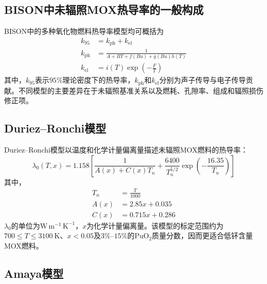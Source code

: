 \subsection{BISON中未辐照MOX热导率的一般构成}

BISON中的多种氧化物燃料热导率模型均可概括为
\begin{equation}
	\begin{aligned}
		k_{95}&=k_{\mathrm{ph}}+k_{\mathrm{el}}
				\\
				k_{\mathrm{ph}}
				&=\frac{1}{A+BT+f(Bu)+g(Bu)h(T)}
				\\
				k_{\mathrm{el}}
				&=i(T)\exp\!\left(-\frac{F}{T}\right)
	\end{aligned}
	\label{eq:appendix_bison_thermal_conductivity_general}
\end{equation}
\label{eq:appendix_bison_k95}
\label{eq:appendix_bison_phonon}
\label{eq:appendix_bison_electronic}
其中，$k_{95}$表示$95\%$理论密度下的热导率，$k_{\mathrm{ph}}$和$k_{\mathrm{el}}$分别为声子传导与电子传导贡献。不同模型的主要差异在于未辐照基准关系以及燃耗、孔隙率、组成和辐照损伤修正项。

\subsection{Duriez--Ronchi模型}

Duriez--Ronchi模型以温度和化学计量偏离量描述未辐照MOX燃料的热导率：
\begin{equation}
	\lambda_0(T,x)=1.158
	\left[
	\frac{1}{A(x)+C(x)T_n}
	+\frac{6400}{T_n^{5/2}}
	\exp\!\left(-\frac{16.35}{T_n}\right)
	\right]
	\label{eq:appendix_duriez_ronchi}
\end{equation}
其中，
\begin{equation}
	\begin{aligned}
		T_n&=\frac{T}{1000}\\
				A(x)&=2.85x+0.035\\
				C(x)&=0.715x+0.286
	\end{aligned}
	\label{eq:appendix_duriez_parameters}
\end{equation}
\label{eq:appendix_duriez_reduced_temperature}
\label{eq:appendix_duriez_A}
\label{eq:appendix_duriez_C}
$\lambda_0$的单位为$\mathrm{W\,m^{-1}\,K^{-1}}$，$x$为化学计量偏离量。该模型的标定范围约为$700\leq T\leq3100\ \mathrm{K}$、$x<0.05$及$3\%$--$15\%$的$\mathrm{PuO}_2$质量分数，因而更适合低钚含量MOX燃料。

\subsection{Amaya模型}

